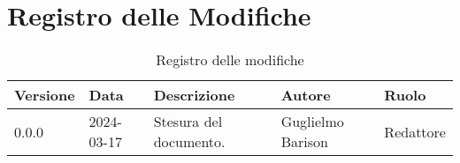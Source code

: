 \section{Registro delle Modifiche}
\begin{table}[ht!]	
		\centering
		\begin{tabular}{p{1.2cm} p{2cm} p{6cm} p{3cm} p{2cm}}
			\toprule
			\textbf{Versione}& \textbf{Data} & \textbf{Descrizione} & \textbf{Autore} & \textbf{Ruolo} \\
			\midrule
			0.0.0 & 2024-03-17 & Stesura del documento.  & Guglielmo Barison & Redattore \\
			\bottomrule
		\end{tabular}
		\caption{Registro delle modifiche}
		\label{table:Registro delle modifiche}
\end{table}
